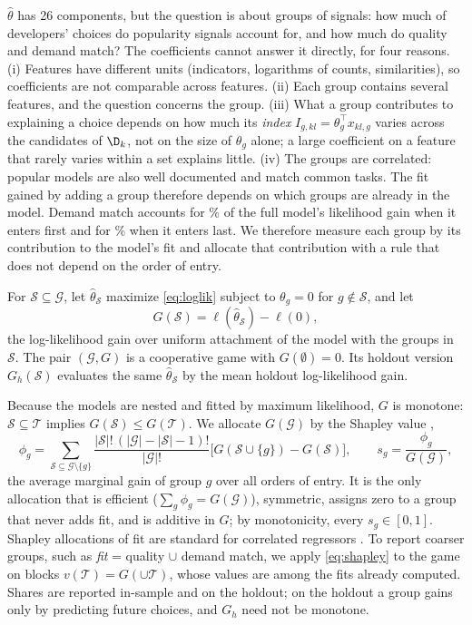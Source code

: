 $\hat\theta$ has 26 components, but the question is about groups of signals: how much of developers' choices do
popularity signals account for, and how much do quality and demand match? The coefficients cannot answer it
directly, for four reasons.
(i) Features have different units (indicators, logarithms of counts, similarities), so coefficients are not
comparable across features.
(ii) Each group contains several features, and the question concerns the group.
(iii) What a group contributes to explaining a choice depends on how much its \emph{index}
$I_{g,kl} = \theta_g^\top x_{kl,g}$ varies across the candidates of $\D_k$, not on the size of $\theta_g$ alone;
a large coefficient on a feature that rarely varies within a set explains little.
(iv) The groups are correlated: popular models are also well documented and match common tasks. The fit gained by
adding a group therefore depends on which groups are already in the model. Demand match accounts for \matchFirst\%
of the full model's likelihood gain when it enters first and for \matchLast\% when it enters last.
We therefore measure each group by its contribution to the model's fit and allocate that contribution with a rule
that does not depend on the order of entry.

\begin{definition}
\label{def:game}
For $\mathcal S \subseteq \mathcal G$, let $\hat\theta_{\mathcal S}$ maximize \eqref{eq:loglik} subject to
$\theta_g = 0$ for $g \notin \mathcal S$, and let
\[
  G(\mathcal S) = \ell(\hat\theta_{\mathcal S}) - \ell(0),
\]
the log-likelihood gain over uniform attachment of the model with the groups in $\mathcal S$. The pair
$(\mathcal G, G)$ is a cooperative game with $G(\emptyset) = 0$. Its holdout version $G_h(\mathcal S)$ evaluates the
same $\hat\theta_{\mathcal S}$ by the mean holdout log-likelihood gain.
\end{definition}

Because the models are nested and fitted by maximum likelihood, $G$ is monotone: $\mathcal S \subseteq \mathcal T$
implies $G(\mathcal S) \le G(\mathcal T)$. We allocate $G(\mathcal G)$ by the Shapley value
\citep{shapley1953value},
\begin{equation}
  \phi_g = \sum_{\mathcal S \subseteq \mathcal G \setminus \{g\}}
  \frac{|\mathcal S|!\,(|\mathcal G|-|\mathcal S|-1)!}{|\mathcal G|!}
  \big[G(\mathcal S \cup \{g\}) - G(\mathcal S)\big],
  \qquad s_g = \frac{\phi_g}{G(\mathcal G)},
  \label{eq:shapley}
\end{equation}
the average marginal gain of group $g$ over all orders of entry. It is the only allocation that is efficient
($\sum_g \phi_g = G(\mathcal G)$), symmetric, assigns zero to a group that never adds fit, and is additive in $G$; by
monotonicity, every $s_g \in [0,1]$. Shapley allocations of fit are standard for correlated regressors
\citep{lipovetsky2001analysis,huettner2012axiomatic}. To report coarser groups, such as \emph{fit} = quality $\cup$
demand match, we apply \eqref{eq:shapley} to the game on blocks $v(\mathcal T) = G(\cup \mathcal T)$, whose values
are among the \nShapFits{} fits already computed. Shares are reported in-sample and on the holdout; on the holdout a
group gains only by predicting future choices, and $G_h$ need not be monotone.

